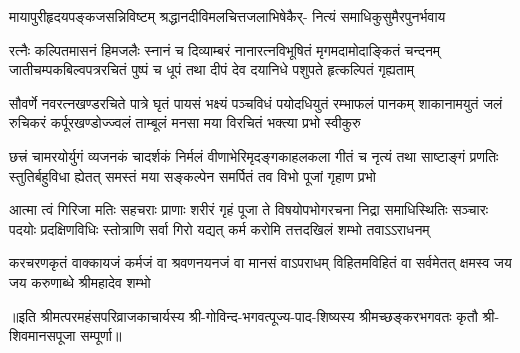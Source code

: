 

{मायापुरीहृदयपङ्कजसन्निविष्टम्}
{श्रद्धानदीविमलचित्तजलाभिषेकैर्-}
{नित्यं समाधिकुसुमैरपुनर्भवाय}

\fourlineindentedshloka
{रत्नैः कल्पितमासनं हिमजलैः स्नानं च दिव्याम्बरं}
{नानारत्नविभूषितं मृगमदामोदाङ्कितं चन्दनम्}
{जातीचम्पकबिल्वपत्ररचितं पुष्पं च धूपं तथा}
{दीपं देव दयानिधे पशुपते हृत्कल्पितं गृह्यताम्}

\fourlineindentedshloka
{सौवर्णे नवरत्नखण्डरचिते पात्रे घृतं पायसं}
{भक्ष्यं पञ्चविधं पयोदधियुतं रम्भाफलं पानकम्}
{शाकानामयुतं जलं रुचिकरं कर्पूरखण्डोज्ज्वलं}
{ताम्बूलं मनसा मया विरचितं भक्त्या प्रभो स्वीकुरु}

\fourlineindentedshloka
{छत्त्रं चामरयोर्युगं व्यजनकं चादर्शकं निर्मलं}
{वीणाभेरिमृदङ्गकाहलकला गीतं च नृत्यं तथा}
{साष्टाङ्गं प्रणतिः स्तुतिर्बहुविधा ह्येतत् समस्तं मया}
{सङ्कल्पेन समर्पितं तव विभो पूजां गृहाण प्रभो}

\fourlineindentedshloka
{आत्मा त्वं गिरिजा मतिः सहचराः प्राणाः शरीरं गृहं}
{पूजा ते विषयोपभोगरचना निद्रा समाधिस्थितिः}
{सञ्चारः पदयोः प्रदक्षिणविधिः स्तोत्राणि सर्वा गिरो}
{यद्यत् कर्म करोमि तत्तदखिलं शम्भो तवाऽऽराधनम्}

\fourlineindentedshloka
{करचरणकृतं वाक्कायजं कर्मजं वा}
{श्रवणनयनजं वा मानसं वाऽपराधम्}
{विहितमविहितं वा सर्वमेतत् क्षमस्व}
{जय जय करुणाब्धे श्रीमहादेव शम्भो}

॥इति श्रीमत्परमहंसपरिव्राजकाचार्यस्य श्री-गोविन्द-भगवत्पूज्य-पाद-शिष्यस्य
श्रीमच्छङ्करभगवतः कृतौ श्री-शिवमानसपूजा सम्पूर्णा॥